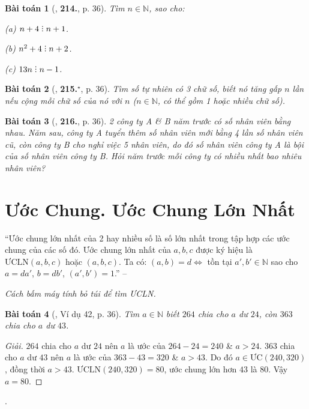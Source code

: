 \documentclass{article}
\numberwithin{equation}{section}
\newtheorem{baitoan}{Bài toán}[section]
\DeclareRobustCommand{\divby}{%
	\mathrel{\vbox{\baselineskip.65ex\lineskiplimit0pt\hbox{.}\hbox{.}\hbox{.}}}%
}
\begin{document}
\begin{baitoan}[\cite{Binh_Toan_6_tap_1}, \textbf{214.}, p. 36]
	Tìm $n\in\mathbb{N}$, sao cho:
	\begin{enumerate*}
		\item[(a)] $n + 4\divby n + 1$.
		\item[(b)] $n^2 + 4\divby n + 2$.
		\item[(c)] $13n\divby n - 1$.
	\end{enumerate*}
\end{baitoan}

\begin{baitoan}[\cite{Binh_Toan_6_tap_1}, \textbf{215.}${}^\star$, p. 36]
	Tìm số tự nhiên có 3 chữ số, biết nó tăng gấp $n$ lần nếu cộng mỗi chữ số của nó với $n$ ($n\in\mathbb{N}$, có thể gồm 1 hoặc nhiều chữ số).
\end{baitoan}

\begin{baitoan}[\cite{Binh_Toan_6_tap_1}, \textbf{216.}, p. 36]
	2 công ty A \& B năm trước có số nhân viên bằng nhau. Năm sau, công ty A tuyển thêm số nhân viên mới bằng 4 lần số nhân viên cũ, còn công ty B cho nghỉ việc 5 nhân viên, do đó số nhân viên công ty A là bội của số nhân viên công ty B. Hỏi năm trước mỗi công ty có nhiều nhất bao nhiêu nhân viên?
\end{baitoan}


\section{Ước Chung. Ước Chung Lớn Nhất}
``Ước chung lớn nhất của 2 hay nhiều số là số lớn nhất trong tập hợp các ước chung của các số đó. Ước chung lớn nhất của $a,b,c$ được ký hiệu là $\mbox{ƯCLN}(a,b,c)$ hoặc $(a,b,c)$. Ta có: $(a,b) = d\Leftrightarrow$ tồn tại $a',b'\in\mathbb{N}$ sao cho $a = da'$, $b = db'$, $(a',b') = 1$.'' -- \cite[\S9, p. 36]{Binh_Toan_6_tap_1}

\textit{Cách bấm máy tính bỏ túi để tìm ƯCLN.}

\begin{baitoan}[\cite{Binh_Toan_6_tap_1}, Ví dụ 42, p. 36]
	Tìm $a\in\mathbb{N}$ biết $264$ chia cho $a$ dư $24$, còn $363$ chia cho $a$ dư $43$.
\end{baitoan}

\begin{proof}[Giải]
	$264$ chia cho $a$ dư $24$ nên $a$ là ước của $264 - 24 = 240$ \& $a > 24$. $363$ chia cho $a$ dư $43$ nên $a$ là ước của $363 - 43 = 320$ \& $a > 43$. Do đó $a\in\mbox{ƯC}(240,320)$, đồng thời $a > 43$. $\mbox{ƯCLN}(240,320) = 80$, ước chung lớn hơn $43$ là $80$. Vậy $a = 80$.
\end{proof}
\cite[Ví dụ 43, p. 37]{Binh_Toan_6_tap_1}.
\end{document}
